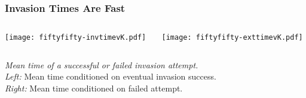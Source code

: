\documentclass{beamer}
\begin{document}
\begin{frame}
\frametitle{Invasion Times Are Fast}
\begin{columns}
	\begin{column}{5.5cm}
		\begin{center}
			\texttt{[image: fiftyfifty-invtimevK.pdf]}
		\end{center}
	\end{column}
	\begin{column}{5.5cm}
		\begin{center}
			\texttt{[image: fiftyfifty-exttimevK.pdf]}
		\end{center}
	\end{column}
\end{columns}
\justifying
	\emph{Mean time of a successful or failed invasion attempt.} \\
	\emph{Left:} Mean time conditioned on eventual invasion success. \\
	\emph{Right:} Mean time conditioned on failed attempt. 
\end{frame}
\end{document}
